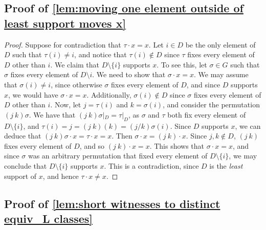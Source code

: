 \documentclass[runningheads]{llncs}
\begin{document}
\subsection{Proof of \autoref{lem:moving one element outside of least support moves x}} \label{appendix:proof of moving one element outside of least support moves x}


\begin{proof}
    Suppose for contradiction that $\tau \cdot x = x$. 
    Let $i \in D$ be the only element of $D$ such that $\tau(i) \neq i$, and notice that $\tau(i) \notin D$ since $\tau$ fixes every element of $D$ other than $i$.
    We claim that $D \setminus \{i\}$ supports $x$. 
    To see this, let $\sigma \in G$ such that $\sigma$ fixes every element of $D \setminus i$. 
    We need to show that $\sigma \cdot x = x$.
    We may assume that $\sigma(i) \neq i$, since otherwise $\sigma$ fixes every element of $D$, and since $D$ supports $x$, we would have $\sigma \cdot x = x$. 
    Additionally, $\sigma(i) \notin D$ since $\sigma$ fixes every element of $D$ other than $i$. 
    Now, let $j = \tau(i)$ and $k = \sigma(i)$, and consider the permutation $(j \ k) \sigma$. 
    We have that $(j \ k) \sigma|_D = \tau|_D$, as $\sigma$ and $\tau$ both fix every element of $D \setminus \{i\}$, and $\tau(i) = j = (j \ k)(k) = (j / k)\sigma(i)$. 
    Since $D$ supports $x$, we can deduce that $(j \ k) \sigma \cdot x = \tau \cdot x = x$. 
    Then $\sigma \cdot x = (j \ k) \cdot x$. 
    Since $j,k \notin D$, $(j \ k)$ fixes every element of $D$, and so $(j \ k) \cdot x = x$. 
    This shows that $\sigma \cdot x = x$, and since $\sigma$ was an arbitrary permutation that fixed every element of $D \setminus \{i\}$, we may conclude that $D \setminus \{i\}$ supports $x$.
    This is a contradiction, since $D$ is the \textit{least} support of $x$, and hence $\tau \cdot x \neq x$.
\end{proof}




\subsection{Proof of \autoref{lem:short witnesses to distinct equiv_L classes}} \label{appendix:proof of short witnesses to distinct equiv_L classes}
\end{document}
